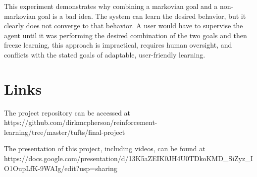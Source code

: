 \documentclass{article}
\begin{document}
This experiment demonstrates why combining a markovian goal and a non-markovian goal is a bad idea. The system can learn the desired behavior, but it clearly does not converge to that behavior. A user would have to supervise the agent until it was performing the desired combination of the two goals and then freeze learning, this approach is impractical, requires human oversight, and conflicts with the stated goals of adaptable, user-friendly learning. 

\section{Links}

The project repository can be accessed at https://github.com/dirkmcpherson/reinforcement-learning/tree/master/tufts/final-project

The presentation of this project, including videos, can be found at https://docs.google.com/presentation/d/13K5aZEIK0JH4U0TDkoKMD_SiZyz_IO1OupLfK-9WAIg/edit?usp=sharing



\end{document}
